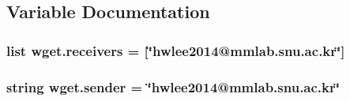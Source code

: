 \subsection{Variable Documentation}
\hypertarget{namespacewget_ad8a4656cb474cdef7bbfc7253795ffa7}{
\subsubsection[{receivers}]{\setlength{\rightskip}{0pt plus 5cm}list wget.\-receivers = \mbox{[}\char`\"{}hwlee2014@mmlab.\-snu.\-ac.\-kr\char`\"{}\mbox{]}}}\label{namespacewget_ad8a4656cb474cdef7bbfc7253795ffa7}
\hypertarget{namespacewget_acf25fe42f54f54315a36328403619b7e}{
\subsubsection[{sender}]{\setlength{\rightskip}{0pt plus 5cm}string wget.\-sender = \char`\"{}hwlee2014@mmlab.\-snu.\-ac.\-kr\char`\"{}}}\label{namespacewget_acf25fe42f54f54315a36328403619b7e}
